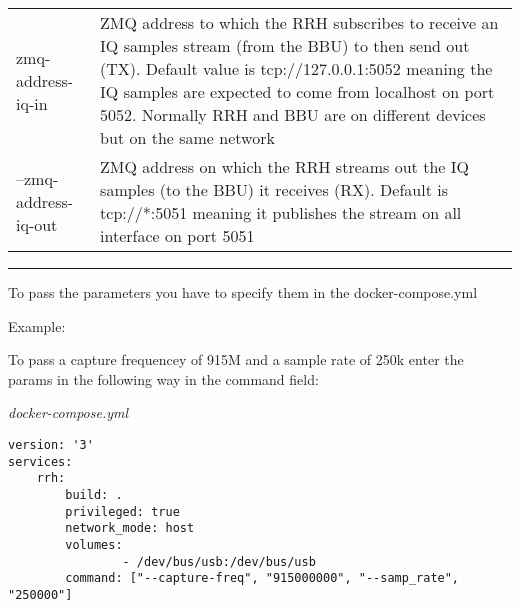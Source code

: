 \begin{longtable}[]{@{}ll@{}}
\begin{minipage}[t]{0.18\columnwidth}
zmq-address-iq-in\strut
\end{minipage} & \begin{minipage}[t]{0.18\columnwidth}\raggedright\strut
ZMQ address to which the RRH subscribes to receive an IQ samples stream
(from the BBU) to then send out (TX). Default value is
tcp://127.0.0.1:5052 meaning the IQ samples are expected to come from
localhost on port 5052. Normally RRH and BBU are on different devices
but on the same network\strut
\end{minipage}\tabularnewline
\begin{minipage}[t]{0.18\columnwidth}\raggedright\strut
--zmq-address-iq-out\strut
\end{minipage} & \begin{minipage}[t]{0.18\columnwidth}\raggedright\strut
ZMQ address on which the RRH streams out the IQ samples (to the BBU) it
receives (RX). Default is tcp://*:5051 meaning it publishes the stream
on all interface on port 5051\strut
\end{minipage}\tabularnewline
\bottomrule
\end{longtable}

\begin{center}\rule{0.5\linewidth}{\linethickness}\end{center}

To pass the parameters you have to specify them in the
docker-compose.yml

Example:

To pass a capture frequencey of 915M and a sample rate of 250k enter the
params in the following way in the command field:

\emph{docker-compose.yml}

\begin{verbatim}
version: '3'
services:
    rrh:
        build: .
        privileged: true
        network_mode: host
        volumes:
                - /dev/bus/usb:/dev/bus/usb
        command: ["--capture-freq", "915000000", "--samp_rate", "250000"]
\end{verbatim}

